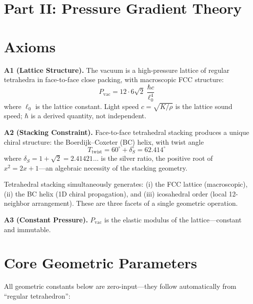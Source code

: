 \documentclass[12pt,a4paper,twocolumn]{article}
\newcommand{\dS}{\delta_{\!S}}
\newcommand{\Ttwist}{T_{\mathrm{twist}}}
\newcommand{\Pvac}{P_{\mathrm{vac}}}
\newcommand{\lzero}{\ell_0}
\begin{document}

\section*{Part II: Pressure Gradient Theory}

\section{Axioms}

\textbf{A1 (Lattice Structure).} The vacuum is a high-pressure lattice of regular tetrahedra in face-to-face close packing, with macroscopic FCC structure:
\begin{equation}
\Pvac = 12 \cdot 6\sqrt{2}\;\frac{\hbar c}{\lzero^4}
\label{eq:Pvac}
\end{equation}
where $\lzero$ is the lattice constant. Light speed $c = \sqrt{K/\rho}$ is the lattice sound speed; $\hbar$ is a derived quantity, not independent.

\textbf{A2 (Stacking Constraint).} Face-to-face tetrahedral stacking produces a unique chiral structure: the Boerdijk--Coxeter (BC) helix, with twist angle
\begin{equation}
\Ttwist = 60^\circ + \dS^\circ = 62.414^\circ
\end{equation}
where $\dS = 1+\sqrt{2} = 2.41421\ldots$ is the silver ratio, the positive root of $x^2 = 2x+1$---an algebraic necessity of the stacking geometry.

Tetrahedral stacking simultaneously generates: (i) the FCC lattice (macroscopic), (ii) the BC helix (1D chiral propagation), and (iii) icosahedral order (local 12-neighbor arrangement). These are three facets of a single geometric operation.

\textbf{A3 (Constant Pressure).} $\Pvac$ is the elastic modulus of the lattice---constant and immutable.


\section{Core Geometric Parameters}

All geometric constants below are zero-input---they follow automatically from ``regular tetrahedron'':
\end{document}
